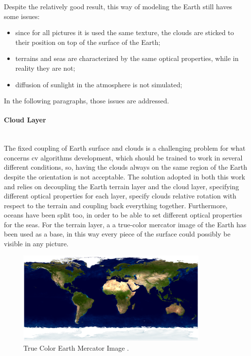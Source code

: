 Despite the relatively good result, this way of modeling the Earth still haves some issues:
\begin{itemize}
  \item since for all pictures it is used the same texture, the clouds are sticked to their position on top of the surface of the Earth;
  \item terrains and seas are characterized by the same optical properties, while in reality they are not;
  \item diffusion of sunlight in the atmosphere is not simulated;
\end{itemize}
In the following paragraphs, those issues are addressed.

\paragraph{Cloud Layer}\mbox{}\\
The fixed coupling of Earth surface and clouds is a challenging problem for what concerns \acrshort{cv} algorithms development, which should be trained to work in several different conditions, so, having the clouds always on the same region of the Earth despite the orientation is not acceptable.
The solution adopted in both this work and \cite{jacopo} relies on decoupling the Earth terrain layer and the cloud layer, specifying different optical properties for each layer, specify clouds relative rotation with respect to the terrain and coupling back everything together.
Furthermore, oceans have been split too, in order to be able to set different optical properties for the seas.
For the terrain layer, a a true-color mercator image of the Earth has been used as a base, in this way every piece of the surface could possibly be visible in any picture.

\begin{figure}[htbp]
  \centering
  \includegraphics[width=0.85\textwidth]{gfx/earthMercator.eps}
  \caption{True Color Earth Mercator Image \cite{bluemarble}.}
  \label{fig:EarthMercator}
\end{figure}

